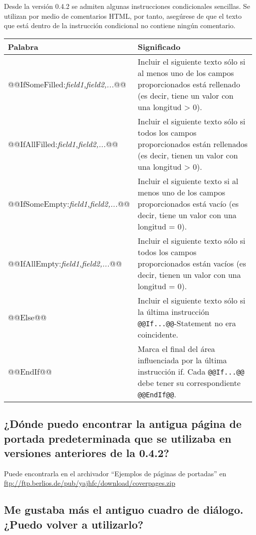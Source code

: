 \documentclass[a4paper,10pt]{scrartcl}
\begin{document}
Desde la versión 0.4.2 se admiten algunas instrucciones condicionales sencillas. Se utilizan por medio de comentarios HTML, por tanto, asegúrese de que el texto que está dentro de la instrucción condicional no contiene ningún comentario.
\begin{center}
\begin{tabular}{|l|p{}|}
\hline
\bfseries Palabra & \bfseries Significado \\
\hline\hline
\ttfamily @@IfSomeFilled:\textit{field1,field2,...}@@ & Incluir el siguiente texto sólo si al menos uno de los campos proporcionados está rellenado (es decir, tiene un valor con una longitud > 0).\\\hline
\ttfamily @@IfAllFilled:\textit{field1,field2,...}@@ & Incluir el siguiente texto sólo si todos los campos proporcionados están rellenados (es decir, tienen un valor con una longitud > 0).\\\hline
\ttfamily @@IfSomeEmpty:\textit{field1,field2,...}@@ & Incluir el siguiente texto si al menos uno de los campos proporcionados está vacío (es decir, tiene un valor con una longitud = 0).\\\hline
\ttfamily @@IfAllEmpty:\textit{field1,field2,...}@@ & Incluir el siguiente texto sólo si todos los campos proporcionados están vacíos (es decir, tienen un valor con una longitud = 0).\\\hline
\ttfamily @@Else@@ & Incluir el siguiente texto sólo si la última instrucción \texttt{@@If...@@}-Statement no era coincidente.\\\hline
\ttfamily @@EndIf@@ & Marca el final del área influenciada por la última instrucción if. Cada \texttt{@@If...@@} debe tener su correspondiente \texttt{@@EndIf@@}.\\\hline
\end{tabular}
\end{center}

\subsection{¿Dónde puedo encontrar la antigua página de portada predeterminada que se utilizaba en versiones anteriores de la 0.4.2?}

Puede encontrarla en el archivador ``Ejemplos de páginas de portadas'' en \url{ftp://ftp.berlios.de/pub/yajhfc/download/coverpages.zip}


\subsection{Me gustaba más el antiguo cuadro de diálogo. ¿Puedo volver a utilizarlo?}
\end{document}
